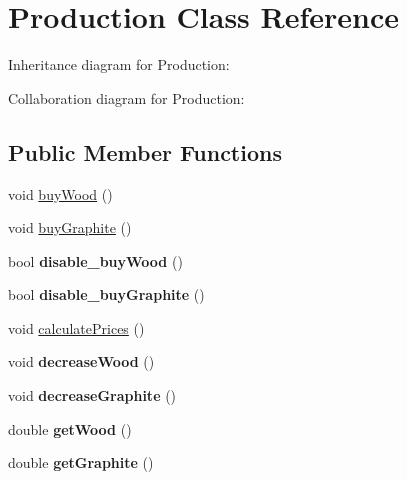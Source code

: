 \hypertarget{classProduction}{}\section{Production Class Reference}
\label{classProduction}


Inheritance diagram for Production\+:


Collaboration diagram for Production\+:
\subsection*{Public Member Functions}
\begin{DoxyCompactItemize}
\item 
void \hyperlink{classProduction_a5eea7af1f4949832bcc0c019f420d655}{buy\+Wood} ()
\item 
void \hyperlink{classProduction_adf62fb3241254aa3412ed9a9d1fb27a2}{buy\+Graphite} ()
\item 
\mbox{\label{classProduction_a5f5c38b7f3f7b23f9029d562c7e53025}} 
bool {\bfseries disable\+\_\+buy\+Wood} ()
\item 
\mbox{\label{classProduction_a4c87c63f0fdc741f9185dcda6793463e}} 
bool {\bfseries disable\+\_\+buy\+Graphite} ()
\item 
void \hyperlink{classProduction_a4a9bbd94b71b1d24d836d9ad79bed97b}{calculate\+Prices} ()
\item 
\mbox{\label{classProduction_a42c46b93e65cb3f84db76562a27d44f6}} 
void {\bfseries decrease\+Wood} ()
\item 
\mbox{\label{classProduction_aa5180ed4aac0e3d8ecec30596c9b1751}} 
void {\bfseries decrease\+Graphite} ()
\item 
\mbox{\label{classProduction_a8991aa503f8d94ae01ff9b7f08043c58}} 
double {\bfseries get\+Wood} ()
\item 
\mbox{\label{classProduction_ad8e6b675848c58fcf04e214e383a87fd}} 
double {\bfseries get\+Graphite} ()
\end{DoxyCompactItemize}
